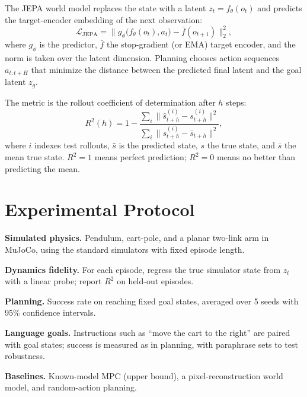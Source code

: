 \documentclass[conference]{IEEEtran}
\begin{document}
The JEPA world model replaces the state with a latent $z_t=f_\theta(o_t)$ and predicts the target-encoder embedding of the next observation:
\begin{equation}
\mathcal{L}_{\mathrm{JEPA}}=\big\lVert g_\phi\big(f_\theta(o_t),a_t\big)-\bar f(o_{t+1})\big\rVert_2^2,
\end{equation}
where $g_\phi$ is the predictor, $\bar f$ the stop-gradient (or EMA) target encoder, and the norm is taken over the latent dimension. Planning chooses action sequences $a_{t:t+H}$ that minimize the distance between the predicted final latent and the goal latent $z_g$.

The metric is the rollout coefficient of determination after $h$ steps:
\begin{equation}
R^2(h)=1-\frac{\sum_{i}\lVert\hat s^{(i)}_{t+h}-s^{(i)}_{t+h}\rVert^2}{\sum_{i}\lVert s^{(i)}_{t+h}-\bar s_{t+h}\rVert^2},
\end{equation}
where $i$ indexes test rollouts, $\hat s$ is the predicted state, $s$ the true state, and $\bar s$ the mean true state. $R^2=1$ means perfect prediction; $R^2=0$ means no better than predicting the mean.

\section{Experimental Protocol}
\textbf{Simulated physics.} Pendulum, cart-pole, and a planar two-link arm in MuJoCo, using the standard simulators with fixed episode length.

\textbf{Dynamics fidelity.} For each episode, regress the true simulator state from $z_t$ with a linear probe; report $R^2$ on held-out episodes.

\textbf{Planning.} Success rate on reaching fixed goal states, averaged over 5 seeds with 95\% confidence intervals.

\textbf{Language goals.} Instructions such as ``move the cart to the right'' are paired with goal states; success is measured as in planning, with paraphrase sets to test robustness.

\textbf{Baselines.} Known-model MPC (upper bound), a pixel-reconstruction world model, and random-action planning.
\end{document}
